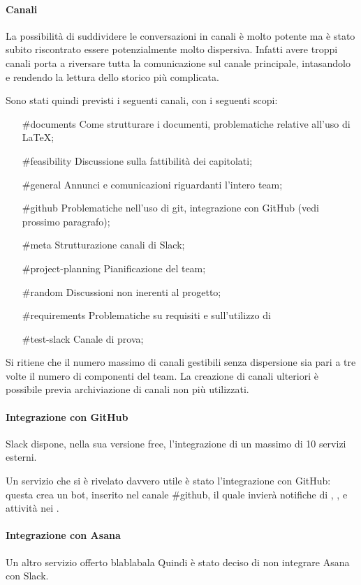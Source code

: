 \paragraph{Canali}
La possibilità di suddividere le conversazioni in canali è molto potente ma è stato subito riscontrato essere potenzialmente molto dispersiva. Infatti avere troppi canali porta a riversare tutta la comunicazione sul canale principale, intasandolo e rendendo la lettura dello storico più complicata.

Sono stati quindi previsti i seguenti canali, con i seguenti scopi:

\begin{itemize}
\item [\#documents] Come strutturare i documenti, problematiche relative all'uso di \LaTeX{};
\item [\#feasibility] Discussione sulla fattibilità dei capitolati;
\item [\#general] Annunci e comunicazioni riguardanti l'intero team;
\item [\#github] Problematiche nell'uso di git, integrazione con GitHub (vedi prossimo paragrafo);
\item [\#meta] Strutturazione canali di Slack;
\item [\#project-planning] Pianificazione del team;
\item [\#random] Discussioni non inerenti al progetto;
\item [\#requirements] Problematiche su requisiti e sull'utilizzo di 
\item [\#test-slack] Canale di prova;
\end{itemize}

Si ritiene che il numero massimo di canali gestibili senza dispersione sia pari a tre volte il numero di componenti del team. La creazione di canali ulteriori è possibile previa archiviazione di canali non più utilizzati. 

\paragraph{Integrazione con GitHub}
Slack dispone, nella sua versione free, l'integrazione di un massimo di 10 servizi esterni.

Un servizio che si è rivelato davvero utile è stato l'integrazione con GitHub: questa crea un bot, inserito nel canale \#github, il quale invierà notifiche di , , e attività nei .

\paragraph{Integrazione con Asana}
Un altro servizio offerto blablabala
Quindi è stato deciso di non integrare Asana con Slack.





